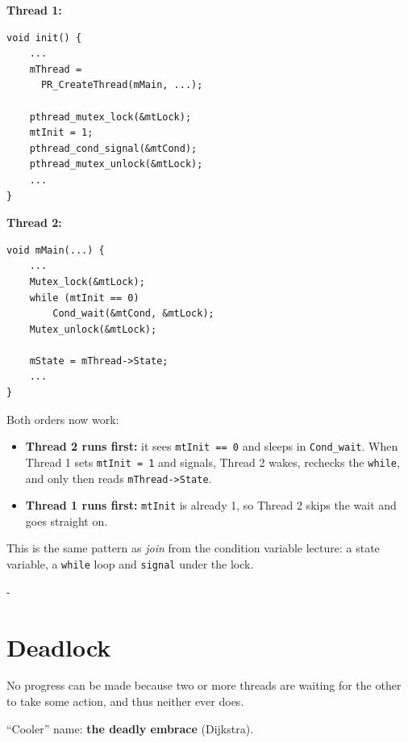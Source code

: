 \documentclass[11pt,a4paper]{article}
\makeatletter
\newcommand{\keepspace}[1]{\par\penalty-100\begingroup
  \setlength{\dimen@}{#1}\dimen@ii\pagegoal\advance\dimen@ii-\pagetotal
  \ifdim\dimen@>\dimen@ii\ifdim\dimen@ii>\z@\vfil\fi\break\fi\endgroup}
\makeatother
\begin{document}
\begin{center}
\begin{minipage}[t]{0.5\textwidth}
\textbf{Thread 1:}
\begin{lstlisting}[numbers=none]
void init() {
    ...
    mThread =
      PR_CreateThread(mMain, ...);

    pthread_mutex_lock(&mtLock);
    mtInit = 1;
    pthread_cond_signal(&mtCond);
    pthread_mutex_unlock(&mtLock);
    ...
}
\end{lstlisting}
\end{minipage}\hfill
\begin{minipage}[t]{0.46\textwidth}
\textbf{Thread 2:}
\begin{lstlisting}[numbers=none]
void mMain(...) {
    ...
    Mutex_lock(&mtLock);
    while (mtInit == 0)
        Cond_wait(&mtCond, &mtLock);
    Mutex_unlock(&mtLock);

    mState = mThread->State;
    ...
}
\end{lstlisting}
\end{minipage}
\end{center}

Both orders now work:
\begin{itemize}
  \item \textbf{Thread 2 runs first:} it sees \texttt{mtInit == 0} and
        sleeps in \texttt{Cond\_wait}. When Thread 1 sets \texttt{mtInit = 1}
        and signals, Thread 2 wakes, rechecks the \texttt{while}, and only
        then reads \texttt{mThread->State}.
  \item \textbf{Thread 1 runs first:} \texttt{mtInit} is already 1, so Thread
        2 skips the wait and goes straight on.
\end{itemize}
This is the same pattern as \emph{join} from the condition variable lecture: a
state variable, a \texttt{while} loop and \texttt{signal} under the lock.

\keepspace{12\baselineskip}
\section{Deadlock}\label{sec:dl}

\begin{defbox}[Deadlock]
No progress can be made because two or more threads are waiting for the
other to take some action, and thus neither ever does.

``Cooler'' name: \textbf{the deadly embrace} (Dijkstra).
\end{defbox}
\end{document}
